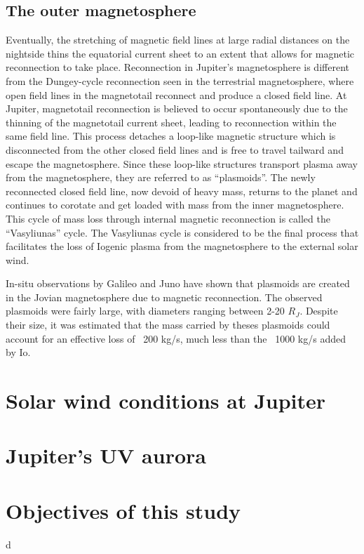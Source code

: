 \subsection{The outer magnetosphere}
Eventually, the stretching of magnetic field lines at large radial distances on the nightside thins the equatorial current sheet to an extent that allows for magnetic reconnection to take place. Reconnection in Jupiter's magnetosphere is different from the Dungey-cycle reconnection seen in the terrestrial magnetosphere, where open field lines in the magnetotail reconnect and produce a closed field line. At Jupiter, magnetotail reconnection is believed to occur spontaneously due to the thinning of the magnetotail current sheet, leading to reconnection within the same field line. This process detaches a loop-like magnetic structure which is disconnected from the other closed field lines and is free to travel tailward and escape the magnetosphere. Since these loop-like structures transport plasma away from the magnetosphere, they are referred to as ``plasmoids''. The newly reconnected closed field line, now devoid of heavy mass, returns to the planet and continues to corotate and get loaded with mass from the inner magnetosphere. This cycle of mass loss through internal magnetic reconnection is called the ``Vasyliunas'' cycle. The Vasyliunas cycle is considered to be the final process that facilitates the loss of Iogenic plasma from the magnetosphere to the external solar wind.

In-situ observations by Galileo and Juno have shown that plasmoids are created in the Jovian magnetosphere due to magnetic reconnection. The observed plasmoids were fairly large, with diameters ranging between 2-20 $R_J$. Despite their size, it was estimated that the mass carried by theses plasmoids could account for an effective loss of ~200 kg/s, much less than the ~1000 kg/s added by Io. 


\section{Solar wind conditions at Jupiter}

\section{Jupiter's UV aurora}

\section{Objectives of this study}d


